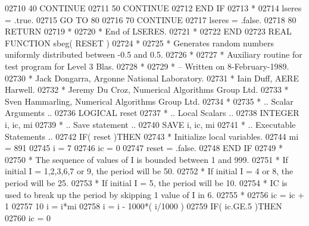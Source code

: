 \begin{DoxyCode}
02710    40       \textcolor{keywordflow}{CONTINUE}
02711    50    \textcolor{keywordflow}{CONTINUE}
02712 \textcolor{keywordflow}{      END IF}
02713 \textcolor{comment}{*}
02714       lseres = .true.
02715       \textcolor{keywordflow}{GO TO} 80
02716    70 \textcolor{keywordflow}{CONTINUE}
02717       lseres = .false.
02718    80 \textcolor{keywordflow}{RETURN}
02719 \textcolor{comment}{*}
02720 \textcolor{comment}{*     End of LSERES.}
02721 \textcolor{comment}{*}
02722 \textcolor{keyword}{      END}
02723 \textcolor{keyword}{      REAL }\textcolor{keyword}{FUNCTION }sbeg( RESET )
02724 \textcolor{comment}{*}
02725 \textcolor{comment}{*  Generates random numbers uniformly distributed between -0.5 and 0.5.}
02726 \textcolor{comment}{*}
02727 \textcolor{comment}{*  Auxiliary routine for test program for Level 3 Blas.}
02728 \textcolor{comment}{*}
02729 \textcolor{comment}{*  -- Written on 8-February-1989.}
02730 \textcolor{comment}{*     Jack Dongarra, Argonne National Laboratory.}
02731 \textcolor{comment}{*     Iain Duff, AERE Harwell.}
02732 \textcolor{comment}{*     Jeremy Du Croz, Numerical Algorithms Group Ltd.}
02733 \textcolor{comment}{*     Sven Hammarling, Numerical Algorithms Group Ltd.}
02734 \textcolor{comment}{*}
02735 \textcolor{comment}{*     .. Scalar Arguments ..}
02736       \textcolor{keywordtype}{LOGICAL}            reset
02737 \textcolor{comment}{*     .. Local Scalars ..}
02738       \textcolor{keywordtype}{INTEGER}            i, ic, mi
02739 \textcolor{comment}{*     .. Save statement ..}
02740       \textcolor{keywordtype}{SAVE}               i, ic, mi
02741 \textcolor{comment}{*     .. Executable Statements ..}
02742       \textcolor{keywordflow}{IF}( reset )\textcolor{keywordflow}{THEN}
02743 \textcolor{comment}{*        Initialize local variables.}
02744          mi = 891
02745          i = 7
02746          ic = 0
02747          reset = .false.
02748 \textcolor{keywordflow}{      END IF}
02749 \textcolor{comment}{*}
02750 \textcolor{comment}{*     The sequence of values of I is bounded between 1 and 999.}
02751 \textcolor{comment}{*     If initial I = 1,2,3,6,7 or 9, the period will be 50.}
02752 \textcolor{comment}{*     If initial I = 4 or 8, the period will be 25.}
02753 \textcolor{comment}{*     If initial I = 5, the period will be 10.}
02754 \textcolor{comment}{*     IC is used to break up the period by skipping 1 value of I in 6.}
02755 \textcolor{comment}{*}
02756       ic = ic + 1
02757    10 i = i*mi
02758       i = i - 1000*( i/1000 )
02759       \textcolor{keywordflow}{IF}( ic.GE.5 )\textcolor{keywordflow}{THEN}
02760          ic = 0

\end{DoxyCode}

